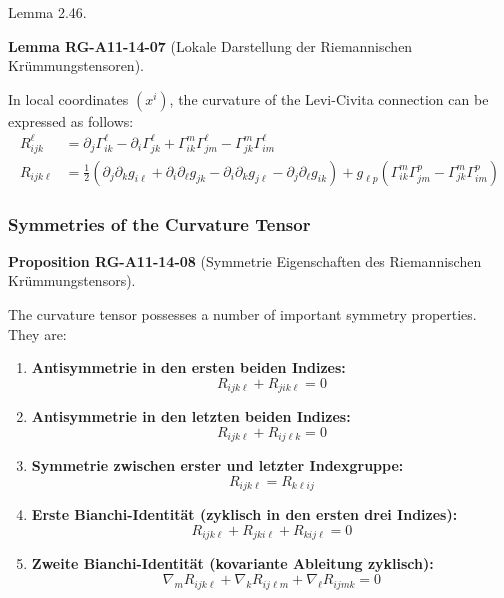 \documentclass[10pt, letterpaper]{article}
\newcommand{\CustomHeading}[3]{%
  \par\medskip\noindent%
  \textbf{#1 #2} \textnormal{(#3)}.\enskip%
}
\newenvironment{PROP}[2]{\begin{unitbox}\CustomHeading{Proposition}{#1}{#2}}{\end{unitbox}}
\newenvironment{LEM}[2]{\begin{unitbox}\CustomHeading{Lemma}{#1}{#2}}{\end{unitbox}}
\begin{document}
Lemma 2.46. 

\begin{LEM}{RG-A11-14-07}{Lokale Darstellung der Riemannischen Krümmungstensoren}
In local coordinates $(x^{i})$, the curvature of the Levi-Civita connection can be expressed as follows:
$$
\begin{aligned}
R_{i j k}^{\ell} & =\partial_{j} \Gamma_{i k}^{\ell}-\partial_{i} \Gamma_{j k}^{\ell}+\Gamma_{i k}^{m} \Gamma_{j m}^{\ell}-\Gamma_{j k}^{m} \Gamma_{i m}^{\ell} \\
R_{i j k \ell} & =\frac{1}{2}\left(\partial_{j} \partial_{k} g_{i \ell}+\partial_{i} \partial_{\ell} g_{j k}-\partial_{i} \partial_{k} g_{j \ell}-\partial_{j} \partial_{\ell} g_{i k}\right)+g_{\ell p}\left(\Gamma_{i k}^{m} \Gamma_{j m}^{p}-\Gamma_{j k}^{m} \Gamma_{i m}^{p}\right)
\end{aligned}
$$
\end{LEM}



\subsubsection*{Symmetries of the Curvature Tensor}


\begin{PROP}{RG-A11-14-08}{Symmetrie Eigenschaften des Riemannischen Krümmungstensors}
The curvature tensor possesses a number of important symmetry properties. They are:

\begin{enumerate}
  \item \textbf{Antisymmetrie in den ersten beiden Indizes:}
  \[
  R_{i j k \ell} + R_{j i k \ell} = 0
  \]

  \item \textbf{Antisymmetrie in den letzten beiden Indizes:}
  \[
  R_{i j k \ell} + R_{i j \ell k} = 0
  \]

  \item \textbf{Symmetrie zwischen erster und letzter Indexgruppe:}
  \[
  R_{i j k \ell} = R_{k \ell i j}
  \]

  \item \textbf{Erste Bianchi-Identität (zyklisch in den ersten drei Indizes):}
  \[
  R_{i j k \ell} + R_{j k i \ell} + R_{k i j \ell} = 0
  \]

  \item \textbf{Zweite Bianchi-Identität (kovariante Ableitung zyklisch):}
  \[
  \nabla_{m} R_{i j k \ell} + \nabla_{k} R_{i j \ell m} + \nabla_{\ell} R_{i j m k} = 0
  \]
\end{enumerate}
\end{PROP}
\end{document}
